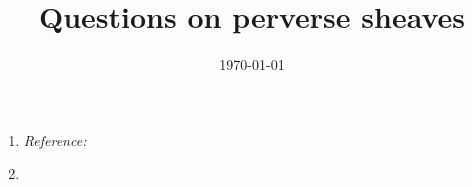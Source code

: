 \documentclass[11pt,a4]{amsart}
\title{Questions on perverse sheaves}
\date{\today}
\numberwithin{equation}{section} %
\begin{document}
\begin{enumerate}
 \item %

   \small
   \emph{Reference:}
   \normalsize
   \item
    \begin{enumerate}
    \end{enumerate}
\end{enumerate}
\end{document}
